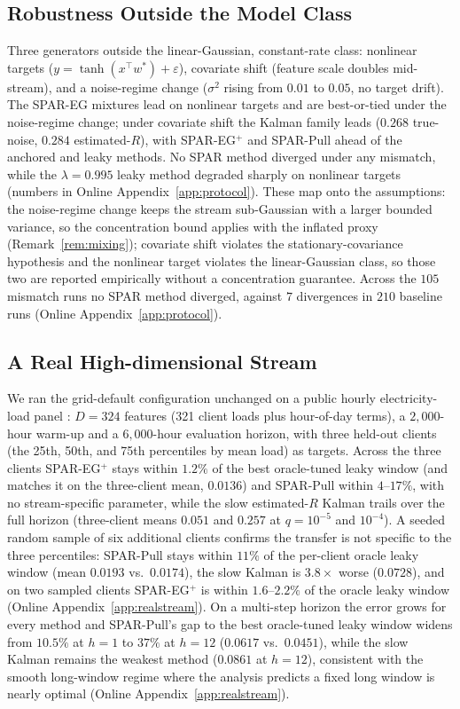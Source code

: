 \documentclass[twoside,11pt]{article}
\begin{document}
\subsection{Robustness Outside the Model Class}
Three generators outside the linear-Gaussian, constant-rate class: nonlinear targets ($y = \tanh(x^\top w^*) + \varepsilon$), covariate shift (feature scale doubles mid-stream), and a noise-regime change ($\sigma^2$ rising from $0.01$ to $0.05$, no target drift).
The SPAR-EG mixtures lead on nonlinear targets and are best-or-tied under the noise-regime change; under covariate shift the Kalman family leads ($0.268$ true-noise, $0.284$ estimated-$R$), with SPAR-EG$^+$ and SPAR-Pull ahead of the anchored and leaky methods.
No SPAR method diverged under any mismatch, while the $\lambda = 0.995$ leaky method degraded sharply on nonlinear targets (numbers in Online Appendix~\ref{app:protocol}). These map onto the assumptions: the noise-regime change keeps the stream sub-Gaussian with a larger bounded variance, so the concentration bound applies with the inflated proxy (Remark~\ref{rem:mixing}); covariate shift violates the stationary-covariance hypothesis and the nonlinear target violates the linear-Gaussian class, so those two are reported empirically without a concentration guarantee. Across the $105$ mismatch runs no SPAR method diverged, against $7$ divergences in $210$ baseline runs (Online Appendix~\ref{app:protocol}).

\subsection{A Real High-dimensional Stream}
\label{sec:realstream}
We ran the grid-default configuration unchanged on a public hourly electricity-load panel \citep{trindade2015electricity,lai2018lstd}: $D = 324$ features (321 client loads plus hour-of-day terms), a $2{,}000$-hour warm-up and a $6{,}000$-hour evaluation horizon, with three held-out clients (the 25th, 50th, and 75th percentiles by mean load) as targets.
Across the three clients SPAR-EG$^+$ stays within $1.2\%$ of the best oracle-tuned leaky window (and matches it on the three-client mean, $0.0136$) and SPAR-Pull within $4$--$17\%$, with no stream-specific parameter, while the slow estimated-$R$ Kalman trails over the full horizon (three-client means $0.051$ and $0.257$ at $q = 10^{-5}$ and $10^{-4}$). A seeded random sample of six additional clients confirms the transfer is not specific to the three percentiles: SPAR-Pull stays within $11\%$ of the per-client oracle leaky window (mean $0.0193$ vs.\ $0.0174$), the slow Kalman is $3.8\times$ worse ($0.0728$), and on two sampled clients SPAR-EG$^+$ is within $1.6$--$2.2\%$ of the oracle leaky window (Online Appendix~\ref{app:realstream}). On a multi-step horizon the error grows for every method and SPAR-Pull's gap to the best oracle-tuned leaky window widens from $10.5\%$ at $h=1$ to $37\%$ at $h=12$ ($0.0617$ vs.\ $0.0451$), while the slow Kalman remains the weakest method ($0.0861$ at $h=12$), consistent with the smooth long-window regime where the analysis predicts a fixed long window is nearly optimal (Online Appendix~\ref{app:realstream}).
\end{document}
